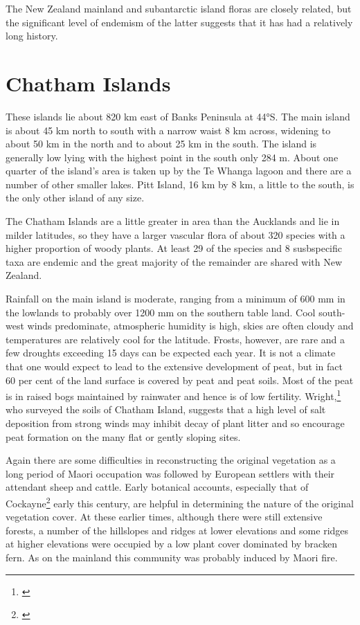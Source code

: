 The New Zealand mainland and subantarctic island floras are closely related, but the significant level of endemism of the latter suggests that it has had a relatively long history.

\section{Chatham Islands}

These islands lie about 820 km east of Banks Peninsula at 44°S.
The main island is about 45 km north to south with a narrow waist 8 km across, widening to about 50 km in the north and to about 25 km in the south.
The island is generally low lying with the highest point in the south only 284 m.
About one quarter of the island's area is taken up by the Te Whanga lagoon and there are a number of other smaller lakes.
Pitt Island, 16 km by 8 km, a little to the south, is the only other island of any size.

The Chatham Islands are a little greater in area than the Aucklands and lie in milder latitudes, so they have a larger vascular flora of about 320 species with a higher proportion of woody plants.
At least 29 of the species and 8 susbspecific taxa are endemic and the great majority of the remainder are shared with New Zealand.

Rainfall on the main island is moderate, ranging from a minimum of 600 mm in the lowlands to probably over 1200 mm on the southern table land.
Cool south-west winds predominate, atmospheric humidity is high, skies are often cloudy and temperatures are relatively cool for the latitude.
Frosts, however, are rare and a few droughts exceeding 15 days can be expected each year.
It is not a climate that one would expect to lead to the extensive development of peat, but in fact 60 per cent of the land surface is covered by peat and peat soils.
Most of the peat is in raised bogs maintained by rainwater and hence is of low fertility.
Wright,\footnote{\cite{wright1959soils}} who surveyed the soils of Chatham Island, suggests that a high level of salt deposition from strong winds may inhibit decay of plant litter and so encourage peat formation on the many flat or gently sloping sites.

Again there are some difficulties in reconstructing the original vegetation as a long period of Maori occupation was followed by European settlers with their attendant sheep and cattle.
Early botanical accounts, especially that of Cockayne\footnote{\cite{cockayne1902chatham}} early this century, are helpful in determining the nature of the original vegetation cover.
At these earlier times, although there were still extensive forests, a number of the hillslopes and ridges at lower elevations and some ridges at higher elevations were occupied by a low plant cover dominated by bracken fern.
As on the mainland this community was probably induced by Maori fire.

